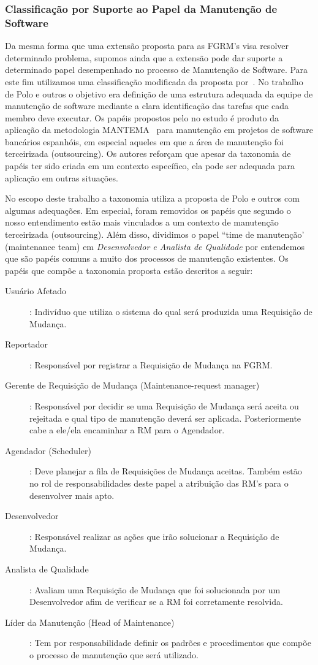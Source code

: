 \subsubsection{Classificação por Suporte ao Papel da Manutenção de Software}
\label{subsubsec:map-esquema-suporte-papel-man}

Da mesma forma que uma extensão proposta para as FGRM's visa resolver
determinado problema, supomos ainda que a extensão pode dar suporte a
determinado papel desempenhado no processo de Manutenção de Software. Para este
fim utilizamos uma classificação modificada da proposta por~\cite{Polo1999}. No
trabalho de Polo e outros o objetivo era definição de uma estrutura adequada da
equipe de manutenção de software mediante a clara identificação das tarefas que
cada membro deve executar. Os papéis propostos pelo no estudo é produto da
aplicação da metodologia MANTEMA~\cite{756695} para manutenção em projetos de
software bancários espanhóis, em especial aqueles em que a área de manutenção
foi terceirizada (outsourcing). Os autores reforçam que apesar da taxonomia de
papéis ter sido criada em um contexto específico, ela pode ser adequada para
aplicação em outras situações.

No escopo deste trabalho a taxonomia utiliza a proposta de Polo e outros com
algumas adequações. Em especial, foram removidos os papéis que segundo o nosso
entendimento estão mais vinculados a um contexto de manutenção terceirizada
(outsourcing). Além disso, dividimos o papel ``time de manutenção' (maintenance
team) em \textit{Desenvolvedor e Analista de Qualidade} por entendemos que são
papéis comuns a muito dos processos de manutenção existentes. Os papéis que
compõe a taxonomia proposta estão descritos a seguir:

\begin{description}
	\item[Usuário Afetado]: Indivíduo que utiliza o sistema do qual será
		produzida uma Requisição de Mudança.
	\item[Reportador]: Responsável por registrar a Requisição de Mudança na
		FGRM\@.
	\item[Gerente de Requisição de Mudança (Maintenance-request manager)]:
		Responsável por decidir se uma Requisição de Mudança será aceita ou
		rejeitada e qual tipo de manutenção deverá ser aplicada. Posteriormente
		cabe a ele/ela encaminhar a RM para o Agendador.
	\item[Agendador (Scheduler)]: Deve planejar a fila de Requisições de Mudança
		aceitas. Também estão no rol de responsabilidades deste papel a
		atribuição das RM's para o desenvolver mais apto.
	\item[Desenvolvedor]: Responsável realizar as ações que irão solucionar a
		Requisição de Mudança.
	\item[Analista de Qualidade]: Avaliam uma Requisição de Mudança que foi
		solucionada por um Desenvolvedor afim de verificar se a RM foi
		corretamente resolvida.
	\item[Líder da Manutenção (Head of Maintenance)]: Tem por responsabilidade
		definir os padrões e procedimentos que compõe o processo de manutenção
		que será utilizado.
\end{description}

